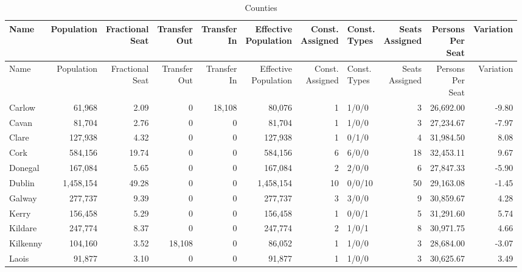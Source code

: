 \documentclass[a4paper]{article}
\begin{document}
\begin{longtable}{lrrrrrrlrrr}
\caption{Counties}
\\ \toprule
Name &Population &\shortstack{Fractional\\Seat} &\shortstack{Transfer\\Out} &\shortstack{Transfer\\In} &\shortstack{Effective\\Population} &\shortstack{Const.\\Assigned} &\shortstack{Const.\\Types} &\shortstack{Seats\\Assigned} &\shortstack{Persons\\Per\\Seat} &Variation \\ \midrule
\endfirsthead
\toprule
Name &Population &\shortstack{Fractional\\Seat} &\shortstack{Transfer\\Out} &\shortstack{Transfer\\In} &\shortstack{Effective\\Population} &\shortstack{Const.\\Assigned} &\shortstack{Const.\\Types} &\shortstack{Seats\\Assigned} &\shortstack{Persons\\Per\\Seat} &Variation \\ \midrule
\endhead
\bottomrule
\endfoot
Carlow&61,968& 2.09&0&18,108&80,076&1&1/0/0&3&26,692.00&-9.80\\ 
Cavan&81,704& 2.76&0&0&81,704&1&1/0/0&3&27,234.67&-7.97\\ 
Clare&127,938& 4.32&0&0&127,938&1&0/1/0&4&31,984.50& 8.08\\ 
Cork&584,156&19.74&0&0&584,156&6&6/0/0&18&32,453.11& 9.67\\ 
Donegal&167,084& 5.65&0&0&167,084&2&2/0/0&6&27,847.33&-5.90\\ 
Dublin&1,458,154&49.28&0&0&1,458,154&10&0/0/10&50&29,163.08&-1.45\\ 
Galway&277,737& 9.39&0&0&277,737&3&3/0/0&9&30,859.67& 4.28\\ 
Kerry&156,458& 5.29&0&0&156,458&1&0/0/1&5&31,291.60& 5.74\\ 
Kildare&247,774& 8.37&0&0&247,774&2&1/0/1&8&30,971.75& 4.66\\ 
Kilkenny&104,160& 3.52&18,108&0&86,052&1&1/0/0&3&28,684.00&-3.07\\ 
Laois&91,877& 3.10&0&0&91,877&1&1/0/0&3&30,625.67& 3.49\\ 

\end{longtable}
\end{document}
